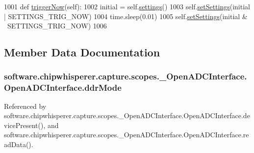 \begin{DoxyCode}
1001     \textcolor{keyword}{def }\hyperlink{classsoftware_1_1chipwhisperer_1_1capture_1_1scopes_1_1__OpenADCInterface_1_1OpenADCInterface_ab8ea200041e774ed9b2350142bafcd01}{triggerNow}(self):
1002         initial = self.\hyperlink{classsoftware_1_1chipwhisperer_1_1capture_1_1scopes_1_1__OpenADCInterface_1_1OpenADCInterface_a3e1455f1e5fe5b7c9235ffb94d17c269}{settings}()
1003         self.\hyperlink{classsoftware_1_1chipwhisperer_1_1capture_1_1scopes_1_1__OpenADCInterface_1_1OpenADCInterface_a797afcc60bb2e95a8e82f56ab6d01f01}{setSettings}(initial | SETTINGS\_TRIG\_NOW)
1004         time.sleep(0.01)
1005         self.\hyperlink{classsoftware_1_1chipwhisperer_1_1capture_1_1scopes_1_1__OpenADCInterface_1_1OpenADCInterface_a797afcc60bb2e95a8e82f56ab6d01f01}{setSettings}(initial & ~SETTINGS\_TRIG\_NOW)
1006 
\end{DoxyCode}


\subsection{Member Data Documentation}
\hypertarget{classsoftware_1_1chipwhisperer_1_1capture_1_1scopes_1_1__OpenADCInterface_1_1OpenADCInterface_ac5e818ed51e968faffbc35028973bd4b}{}
\subsubsection[{ddr\+Mode}]{\setlength{\rightskip}{0pt plus 5cm}software.\+chipwhisperer.\+capture.\+scopes.\+\_\+\+Open\+A\+D\+C\+Interface.\+Open\+A\+D\+C\+Interface.\+ddr\+Mode}\label{classsoftware_1_1chipwhisperer_1_1capture_1_1scopes_1_1__OpenADCInterface_1_1OpenADCInterface_ac5e818ed51e968faffbc35028973bd4b}


Referenced by software.\+chipwhisperer.\+capture.\+scopes.\+\_\+\+Open\+A\+D\+C\+Interface.\+Open\+A\+D\+C\+Interface.\+device\+Present(), and software.\+chipwhisperer.\+capture.\+scopes.\+\_\+\+Open\+A\+D\+C\+Interface.\+Open\+A\+D\+C\+Interface.\+read\+Data().

